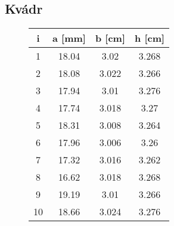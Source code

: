 \documentclass[titlepage]{article}
\begin{document}
\subsection{Kvádr}

\begin{figure}[h]
	\centering
	\begin{tabular}{c|c|c|c}
		i & a [\si{\milli\meter}] & b [\si{\centi\meter}] & h [\si{\centi\meter}] \\\hline\hline
		1  & 18.04 & 3.02  & 3.268 \\ \hline
		2  & 18.08 & 3.022 & 3.266 \\ \hline
		3  & 17.94 & 3.01  & 3.276 \\ \hline
		4  & 17.74 & 3.018 & 3.27  \\ \hline
		5  & 18.31 & 3.008 & 3.264 \\ \hline
		6  & 17.96 & 3.006 & 3.26  \\ \hline
		7  & 17.32 & 3.016 & 3.262 \\ \hline
		8  & 16.62 & 3.018 & 3.268 \\ \hline
		9  & 19.19 & 3.01  & 3.266 \\ \hline
		10 & 18.66 & 3.024 & 3.276 \\
	\end{tabular}
\end{figure}
\end{document}
